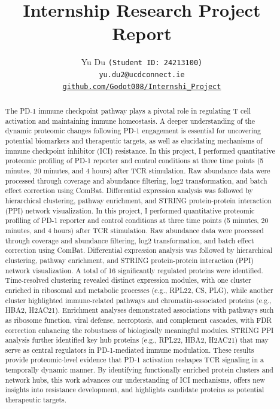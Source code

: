 \documentclass{article}
\title{Internship Research Project Report}
\author{%
  Yu Du \texttt{(Student ID: 24213100)} \\
  \texttt{yu.du2@ucdconnect.ie} \\
  \href{https://github.com/Godot008/UCD_MEIN40420_Internship_Research_Project_2024-25-Summer}{\texttt{github.com/Godot008/Internshi\_Project}}
}
\begin{document}
  \maketitle

  \begin{abstract}
    The PD-1 immune checkpoint pathway plays a pivotal role in regulating T cell activation and maintaining immune homeostasis. A deeper understanding of the dynamic proteomic changes following PD-1 engagement is essential for uncovering potential biomarkers and therapeutic targets, as well as elucidating mechanisms of immune checkpoint inhibitor (ICI) resistance. In this project, I performed quantitative proteomic profiling of PD-1 reporter and control conditions at three time points (5 minutes, 20 minutes, and 4 hours) after TCR stimulation. Raw abundance data were processed through coverage and abundance filtering, log2 transformation, and batch effect correction using ComBat. Differential expression analysis was followed by hierarchical clustering, pathway enrichment, and STRING protein-protein interaction (PPI) network visualization. In this project, I performed quantitative proteomic profiling of PD-1 reporter and control conditions at three time points (5 minutes, 20 minutes, and 4 hours) after TCR stimulation. Raw abundance data were processed through coverage and abundance filtering, log2 transformation, and batch effect correction using ComBat. Differential expression analysis was followed by hierarchical clustering, pathway enrichment, and STRING protein-protein interaction (PPI) network visualization. A total of 16 significantly regulated proteins were identified. Time-resolved clustering revealed distinct expression modules, with one cluster enriched in ribosomal and metabolic processes (e.g., RPL22, CS, PLG), while another cluster highlighted immune-related pathways and chromatin-associated proteins (e.g., HBA2, H2AC21). Enrichment analyses demonstrated associations with pathways such as ribosome function, viral defense, necroptosis, and complement cascades, with FDR correction enhancing the robustness of biologically meaningful modules. STRING PPI analysis further identified key hub proteins (e.g., RPL22, HBA2, H2AC21) that may serve as central regulators in PD-1-mediated immune modulation. These results provide proteomic-level evidence that PD-1 activation reshapes TCR signaling in a temporally dynamic manner. By identifying functionally enriched protein clusters and network hubs, this work advances our understanding of ICI mechanisms, offers new insights into resistance development, and highlights candidate proteins as potential therapeutic targets.
  \end{abstract}
\end{document}
